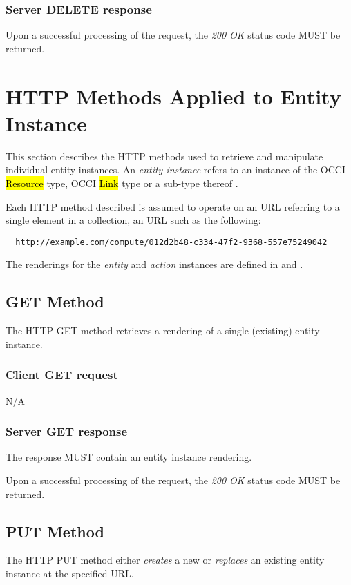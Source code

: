 \documentclass[10pt,a4paper]{article}
\begin{document}
\subsubsection*{Server DELETE response}
Upon a successful processing of the request, the \emph{200 OK} status code MUST be returned.

\section{HTTP Methods Applied to Entity Instance}
\label{sec:http_methods_ei}

This section describes the HTTP methods used to retrieve and manipulate
individual entity instances. An {\em entity instance} refers to an instance
of the OCCI \hl{Resource} type, OCCI \hl{Link} type or a sub-type thereof
\cite{occi:core}.

Each HTTP method described is assumed to operate on an URL referring to
a single element in a collection, an URL such as the following:
\begin{verbatim}
  http://example.com/compute/012d2b48-c334-47f2-9368-557e75249042
\end{verbatim}

The renderings for the {\em entity} and {\em action} instances are defined in \cite{occi:text} and \cite{occi:json}.

\subsection{GET Method}
The HTTP GET method retrieves a rendering of a single (existing) entity instance.

\subsubsection*{Client GET request}
N/A

\subsubsection*{Server GET response}
The response MUST contain an entity instance rendering.

Upon a successful processing of the request, the \emph{200 OK} status code MUST be returned.

\subsection{PUT Method}
The HTTP PUT method either {\em creates} a new or {\em replaces} an existing
entity instance at the specified URL.
\end{document}
